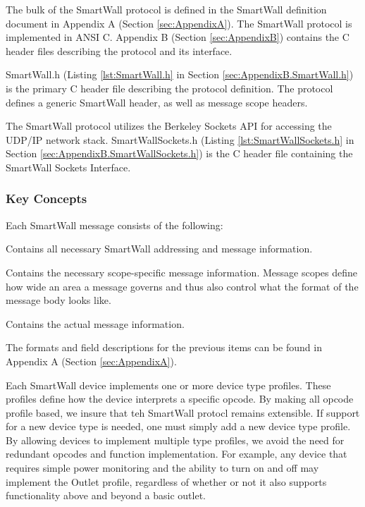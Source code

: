 \documentclass[12pt]{article}
\begin{document}
The bulk of the SmartWall protocol is defined in the SmartWall
definition document in Appendix A (Section \ref{sec:AppendixA}). The
SmartWall protocol is implemented in ANSI C. Appendix B (Section
\ref{sec:AppendixB}) contains the C header files describing the protocol
and its interface.

SmartWall.h (Listing
\ref{lst:SmartWall.h} in Section \ref{sec:AppendixB.SmartWall.h}) is
the primary C header file describing the protocol definition. The
protocol defines a generic SmartWall header, as well as message scope
headers.

The SmartWall protocol utilizes the Berkeley Sockets API for accessing
the UDP/IP network stack. SmartWallSockets.h (Listing
\ref{lst:SmartWallSockets.h} in Section
\ref{sec:AppendixB.SmartWallSockets.h}) is the C header file containing
the SmartWall Sockets Interface.

\subsubsection{Key Concepts}

Each SmartWall message consists of the following:
\begin{description}
  \setlength{\itemsep}{0pt}
  \setlength{\parskip}{0pt}
  \setlength{\parsep}{0pt}
\item[SmartWall Message Header:] Contains all necessary SmartWall
  addressing and message information.
\item[SmartWall Scope Header:] Contains the necessary scope-specific
  message information. Message scopes define how wide an area a
  message governs and thus also control what the format of the message
  body looks like.
\item[SmartWall Message Body:] Contains the actual message information.
\end{description}

The formats and field descriptions for the previous items can be found
in Appendix A (Section \ref{sec:AppendixA}).

Each SmartWall device implements one or more device
type profiles. These profiles define how the device interprets a
specific opcode. By making all opcode profile based, we insure that
teh SmartWall protocl remains extensible. If support for a new device
type is needed, one must simply add a new device type profile. By
allowing devices to implement multiple type profiles, we avoid the need
for redundant opcodes and function implementation. For example, any
device that requires simple power monitoring and the ability to turn
on and off may implement the Outlet profile, regardless of whether or not
it also supports functionality above and beyond a basic outlet.
\end{document}

